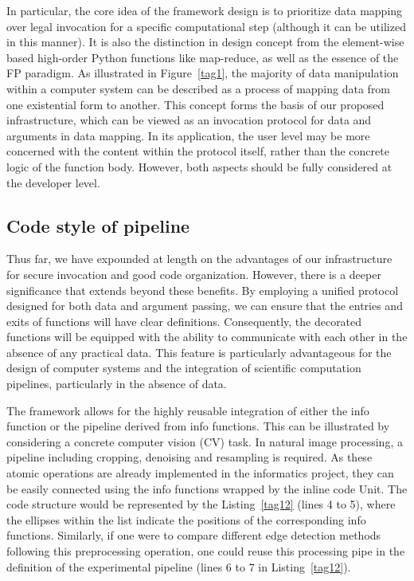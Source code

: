 \documentclass[a4paper,12pt]{article}
\newcommand{\myfig}[1]{{\color{black}Figure~\ref{#1}}}
\newcommand{\mycode}[1]{{\color{black}Listing~\ref{#1}}}
\newcommand{\inlinecode}[1]{{\ttfamily\footnotesize{#1}}}
\begin{document}
In particular, the core idea of the framework design is to prioritize data mapping over legal invocation for a specific computational step (although it can be utilized in this manner). It is also the distinction in design concept from the element-wise based high-order Python functions like map-reduce, as well as the essence of the FP paradigm. As illustrated in \myfig{tag1}, the majority of data manipulation within a computer system can be described as a process of mapping data from one existential form to another. This concept forms the basis of our proposed infrastructure, which can be viewed as an invocation protocol for data and arguments in data mapping. In its application, the user level may be more concerned with the content within the protocol itself, rather than the concrete logic of the function body. However, both aspects should be fully considered at the developer level.\par

\subsection*{Code style of pipeline}

Thus far, we have expounded at length on the advantages of our infrastructure for secure invocation and good code organization. However, there is a deeper significance that extends beyond these benefits. By employing a unified protocol designed for both data and argument passing, we can ensure that the entries and exits of functions will have clear definitions. Consequently, the decorated functions will be equipped with the ability to communicate with each other in the absence of any practical data. This feature is particularly advantageous for the design of computer systems and the integration of scientific computation pipelines, particularly in the absence of data.\par

The framework allows for the highly reusable integration of either the info function or the pipeline derived from info functions. This can be illustrated by considering a concrete computer vision (CV) task. In natural image processing, a pipeline including cropping, denoising and resampling is required. As these atomic operations are already implemented in the informatics project, they can be easily connected using the info functions wrapped by the inline code \inlinecode{Unit}. The code structure would be represented by the \mycode{tag12} (lines 4 to 5), where the ellipses within the list indicate the positions of the corresponding info functions. Similarly, if one were to compare different edge detection methods following this preprocessing operation, one could reuse this \inlinecode{processing} pipe in the definition of the experimental pipeline (lines 6 to 7 in \mycode{tag12}).\par
\end{document}
